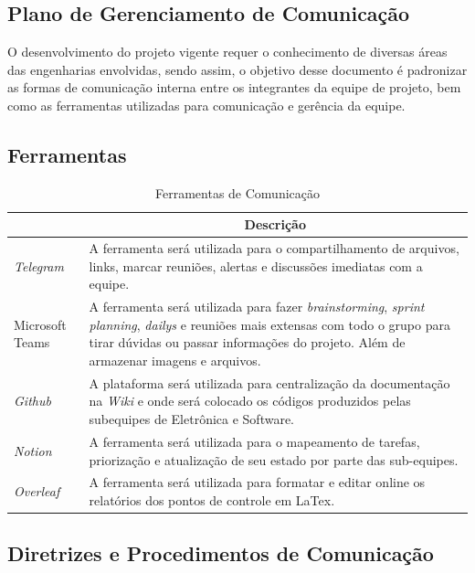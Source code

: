 \begin{apendicesenv}
\chapter{Plano de Gerenciamento de Comunicação}
\label{Comunicação_app}
O desenvolvimento do projeto vigente requer o conhecimento de diversas áreas das engenharias envolvidas, sendo assim, o objetivo desse documento é padronizar as formas de comunicação interna entre os integrantes da equipe de projeto, bem como as ferramentas utilizadas para comunicação e gerência da equipe.

\section{Ferramentas}

\begin{table}[H]
    \centering
    \caption{Ferramentas de Comunicação}
    \label{tab:comunicacao}
    \begin{tabularx}{\textwidth}{|X|X|}
        \hline
        \rowcolor[HTML]{A8DADC}
        \multicolumn{1}{|c|}{\textbf{Ferramenta}} & \multicolumn{1}{|c|}{\textbf{Descrição}} \\ \hline
        \textit{Telegram} &  A ferramenta será utilizada para o compartilhamento de arquivos, links, marcar reuniões, alertas e discussões imediatas com a equipe. \\\hline
        Microsoft Teams &  A ferramenta será utilizada para fazer \textit{brainstorming}, \textit{sprint planning}, \textit{dailys} e reuniões mais extensas com todo o grupo para tirar dúvidas ou passar informações do projeto. Além de armazenar imagens e arquivos. \\\hline
        \textit{Github} & A plataforma será utilizada para centralização da documentação na \textit{Wiki} e onde será colocado os códigos produzidos pelas subequipes de Eletrônica e Software.\\ \hline
        \textit{Notion} & A ferramenta será utilizada para o mapeamento de tarefas, priorização e atualização de seu estado por parte das sub-equipes.  \\ \hline
        \textit{Overleaf} &  A ferramenta será utilizada para formatar e editar online os relatórios dos pontos de controle em LaTex. \\ \hline
    \end{tabularx}
\end{table}

\section{Diretrizes e Procedimentos de Comunicação}


\end{apendicesenv}
